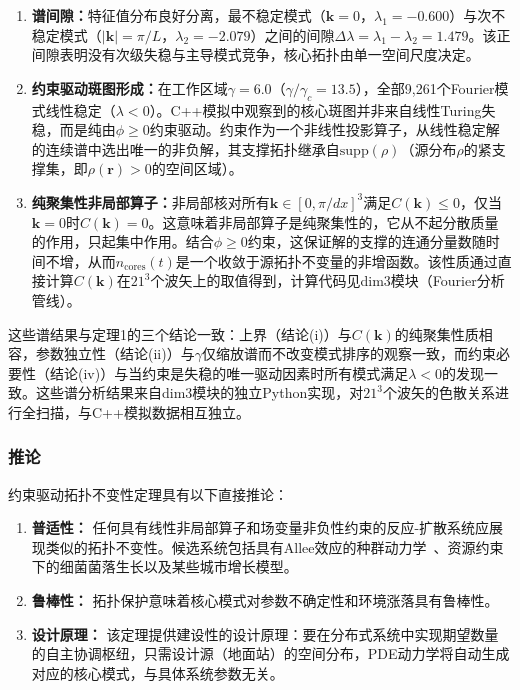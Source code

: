 \documentclass[sn-nature,pdflatex]{sn-jnl}
\begin{document}
\begin{enumerate}
  \item \textbf{谱间隙：}特征值分布良好分离，最不稳定模式（$\mathbf{k}=0$，$\lambda_1 = -0.600$）与次不稳定模式（$|\mathbf{k}| = \pi/L$，$\lambda_2 = -2.079$）之间的间隙$\Delta\lambda = \lambda_1 - \lambda_2 = 1.479$。该正间隙表明没有次级失稳与主导模式竞争，核心拓扑由单一空间尺度决定。

  \item \textbf{约束驱动斑图形成：}在工作区域$\gamma = 6.0$（$\gamma/\gamma_c = 13.5$），全部9,261个Fourier模式线性稳定（$\lambda < 0$）。C++模拟中观察到的核心斑图并非来自线性Turing失稳，而是纯由$\phi \ge 0$约束驱动。约束作为一个非线性投影算子，从线性稳定解的连续谱中选出唯一的非负解，其支撑拓扑继承自$\text{supp}(\rho)$（源分布$\rho$的紧支撑集，即$\rho(\mathbf{r}) > 0$的空间区域）。

  \item \textbf{纯聚集性非局部算子：}非局部核对所有$\mathbf{k} \in [0, \pi/dx]^3$满足$C(\mathbf{k}) \le 0$，仅当$\mathbf{k} = 0$时$C(\mathbf{k}) = 0$。这意味着非局部算子是纯聚集性的，它从不起分散质量的作用，只起集中作用。结合$\phi \ge 0$约束，这保证解的支撑的连通分量数随时间不增，从而$n_{\text{cores}}(t)$是一个收敛于源拓扑不变量的非增函数。该性质通过直接计算$C(\mathbf{k})$在$21^3$个波矢上的取值得到，计算代码见dim3模块（Fourier分析管线）。
\end{enumerate}

这些谱结果与定理1的三个结论一致：上界（结论(i)）与$C(\mathbf{k})$的纯聚集性质相容，参数独立性（结论(ii)）与$\gamma$仅缩放谱而不改变模式排序的观察一致，而约束必要性（结论(iv)）与当约束是失稳的唯一驱动因素时所有模式满足$\lambda < 0$的发现一致。这些谱分析结果来自dim3模块的独立Python实现，对$21^3$个波矢的色散关系进行全扫描，与C++模拟数据相互独立。

\subsubsection{推论}

约束驱动拓扑不变性定理具有以下直接推论：

\begin{enumerate}
  \item \textbf{普适性：} 任何具有线性非局部算子和场变量非负性约束的反应-扩散系统应展现类似的拓扑不变性。候选系统包括具有Allee效应的种群动力学~\cite{meron_2015}、资源约束下的细菌菌落生长以及某些城市增长模型。
  \item \textbf{鲁棒性：} 拓扑保护意味着核心模式对参数不确定性和环境涨落具有鲁棒性。
  \item \textbf{设计原理：} 该定理提供建设性的设计原理：要在分布式系统中实现期望数量的自主协调枢纽，只需设计源（地面站）的空间分布，PDE动力学将自动生成对应的核心模式，与具体系统参数无关。
\end{enumerate}
\end{document}
